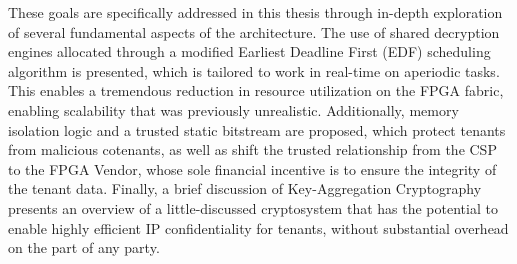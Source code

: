 These goals are specifically addressed in this thesis through in-depth exploration of several fundamental aspects of the architecture. The use of shared decryption engines allocated through a modified Earliest Deadline First (EDF) scheduling algorithm is presented, which is tailored to work in real-time on aperiodic tasks. This enables a tremendous reduction in resource utilization on the FPGA fabric, enabling scalability that was previously unrealistic. Additionally, memory isolation logic and a trusted static bitstream are proposed, which protect tenants from malicious cotenants, as well as shift the trusted relationship from the CSP to the FPGA Vendor, whose sole financial incentive is to ensure the integrity of the tenant data. Finally, a brief discussion of Key-Aggregation Cryptography presents an overview of a little-discussed cryptosystem that has the potential to enable highly efficient IP confidentiality for tenants, without substantial overhead on the part of any party.